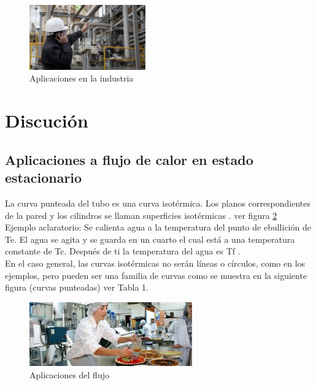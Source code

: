 \documentclass[12pt,a4paper]{article}
\begin{document}
\begin{figure}[h!]
\centering
\includegraphics[width=5cm]{casco}
\caption{Aplicaciones en la industria}
\label{fig:casco}
\end{figure}
\section{Discución}
\subsection{Aplicaciones a flujo de calor en estado estacionario}
La curva punteada del tubo es una curva isotérmica. Los planos correspondientes de la pared y los cilindros se llaman superficies isotérmicas \cite{Yunus2007}. ver figura \ref{fig:images}\\

Ejemplo aclaratorio: Se calienta agua a la temperatura del punto de ebullición de Te. El agua se agita y se guarda en un cuarto el cual está a una temperatura constante de Tc. Después de ti la temperatura del agua es Tf \cite{Alvarez2005}. \\

 En el caso general, las curvas isotérmicas no serán líneas o círculos, como en los ejemplos, pero pueden ser una familia de curvas como se muestra en la siguiente figura (curvas punteadas) \cite{Campell2004} ver Tabla 1.\\
 \newpage
 
\begin{figure}[h!]
\centering
\includegraphics[width=7cm]{images}
\caption{Aplicaciones del flujo}
\label{fig:images}
\end{figure}
\end{document}

